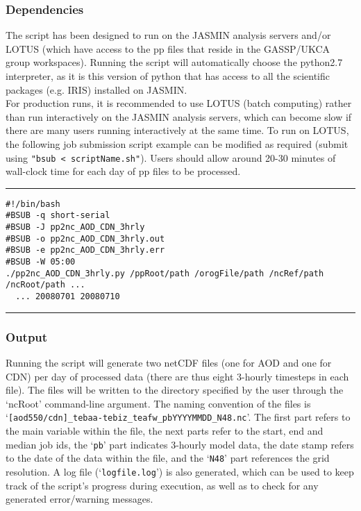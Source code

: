 \documentclass[10pt,a4paper]{article}
\begin{document}
\subsubsection{Dependencies}
The script has been designed to run on the JASMIN analysis servers and/or LOTUS (which have access to the pp files that reside in the GASSP/UKCA group workspaces). Running the script will automatically choose the python2.7 interpreter, as it is this version of python that has access to all the scientific packages (e.g. IRIS) installed on JASMIN.\\
For production runs, it is recommended to use LOTUS (batch computing) rather than run interactively on the JASMIN analysis servers, which can become slow if there are many users running interactively at the same time. To run on LOTUS, the following job submission script example can be modified as required (submit using \texttt{"bsub < scriptName.sh"}). Users should allow around 20-30 minutes of wall-clock time for each day of pp files to be processed.\\
\hrule
\begin{spacing}{1}
\begin{lstlisting}
#!/bin/bash
#BSUB -q short-serial
#BSUB -J pp2nc_AOD_CDN_3hrly
#BSUB -o pp2nc_AOD_CDN_3hrly.out 
#BSUB -e pp2nc_AOD_CDN_3hrly.err 
#BSUB -W 05:00
./pp2nc_AOD_CDN_3hrly.py /ppRoot/path /orogFile/path /ncRef/path /ncRoot/path ...
  ... 20080701 20080710
\end{lstlisting}
\end{spacing}
\hrule

\subsubsection{Output}
Running the script will generate two netCDF files (one for AOD and one for CDN) per day of processed data (there are thus eight 3-hourly timesteps in each file). The files will be written to the directory specified by the user through the `ncRoot' command-line argument. The naming convention of the files is `\texttt{[aod550/cdn]\_tebaa-tebiz\_teafw\_pbYYYYMMDD\_N48.nc}'. The first part refers to the main variable within the file, the next parts refer to the start, end and median job ids, the `\texttt{pb}' part indicates 3-hourly model data, the date stamp refers to the date of the data within the file, and the `\texttt{N48}' part references the grid resolution. A log file (`\texttt{logfile.log}') is also generated, which can be used to keep track of the script's progress during execution, as well as to check for any generated error/warning messages.
\end{document}
